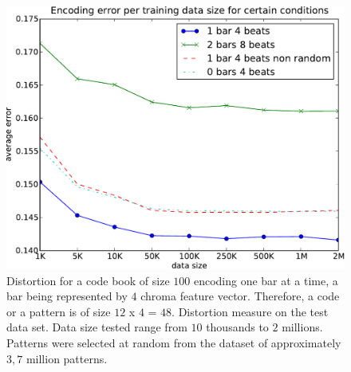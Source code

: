 \documentclass{article}
\begin{document}
\begin{figure}[htb]
\begin{center}
\includegraphics[width=.99\columnwidth]{data_sizes}
\end{center}
\caption{{Distortion for a code book of size $100$ encoding one bar
at a time, a bar being represented by $4$ chroma feature vector.
Therefore, a code or a pattern is of size $12$ x $4$ = $48$.
Distortion measure on the test data set. Data size tested range
from $10$ thousands to $2$ millions. Patterns were selected at
random from the dataset of approximately $3,7$ million patterns.}}
\label{fig:sizes}
\end{figure}
\end{document}

